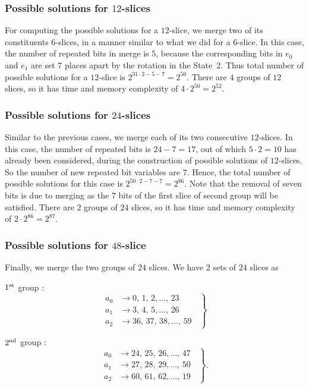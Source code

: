 \documentclass[runningheads]{llncs}
\begin{document}
\subsubsection{Possible solutions for $12$-slices} 
For computing the possible solutions for a $12$-slice, we merge two of its constituents $6$-slices, in a manner similar to what we did for a $6$-slice. In this case, the number of repeated bits in merge is $5$, because the corresponding bits in $e_0$ and $e_1$ are set $7$ places apart by the rotation in the State~2. Thus total number of possible solutions for a $12$-slice is $2^{31 \cdot 2 - 5 - 7} = 2^{50}$. There are $4$ groups of $12$ slices, so it has time and memory complexity of $4 \cdot 2^{50} = 2^{52}$.

\subsubsection{Possible solutions for $24$-slices}  
Similar to the previous cases, we merge each of its two consecutive  
$12$-slices. 
In this case, the number of repeated bits is $24-7=17$, out of which $5\cdot 2=10$ has already been considered, during the construction of possible solutions of $12$-slices. So the number of new repeated bit variables are $7$.
Hence, the total number of possible solutions for this case is $2^{50\cdot 2 - 7 - 7} = 2^{86}$. Note that the removal of seven bits is due to merging as the $7$ bits of the first slice of second group will be satisfied. There are $2$ groups of $24$ slices, so it has time and memory complexity of $2 \cdot 2^{86} = 2^{87}$.\\


\subsubsection{Possible solutions for $48$-slice}
Finally, we merge the two groups of $24$ slices.
We have $2$ sets of $24$ slices as

$1^{\rm st}$ group :
\begin{equation}\label{48_sol_1}
	\left.
	\begin{aligned}
    	a_0 &\rightarrow 0,\, 1,\, 2, \ldots ,\, 23\\
    	a_1 &\rightarrow 3,\,4, \,5, \ldots ,\, 26\\
    	a_2 &\rightarrow 36,\,37,\,38, \ldots ,\, 59
    \end{aligned}
    \;\;\right\}
\end{equation}

$2^{\rm nd}$ group :
\begin{equation}\label{48_sol_2}
	\left.
	\begin{aligned}    
      a_0 & \rightarrow 24,\, 25,\, 26, \ldots , \,47\\
      a_1 & \rightarrow 27,\, 28, \,29, \ldots , \,50\\
      a_2 & \rightarrow 60,\, 61,\,62, \ldots , \,19
    \end{aligned}
	\;\;\right\}.
\end{equation}
\end{document}
